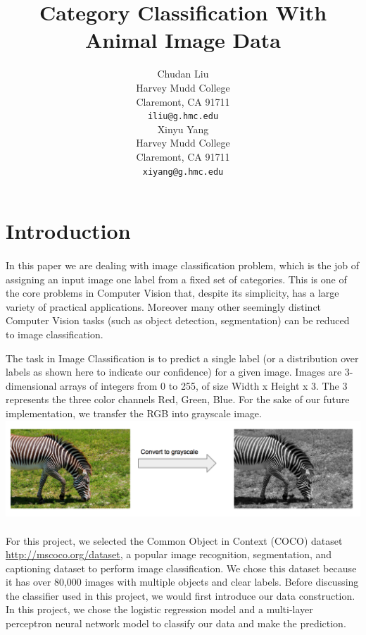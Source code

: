 \documentclass{article}
\title{Category Classification With Animal Image Data}
\author{
 Chudan Liu\\
 Harvey Mudd College\\
 Claremont, CA 91711 \\
 \texttt{iliu@g.hmc.edu} \\
  \And
  Xinyu Yang \\
  Harvey Mudd College \\
  Claremont, CA 91711 \\
  \texttt{xiyang@g.hmc.edu} \\
}
\begin{document}

\maketitle

\begin{abstract}
\end{abstract}

\section{Introduction}
\paragraph{}
	In this paper we are dealing with image classification problem, which is the job of assigning an input image one label from a fixed set of categories. This is one of the core problems in Computer Vision that, despite its simplicity, has a large variety of practical applications. Moreover many other seemingly distinct Computer Vision tasks (such as object detection, segmentation) can be reduced to image classification.
	
The task in Image Classification is to predict a single label (or a distribution over labels as shown here to indicate our confidence) for a given image. Images are 3-dimensional arrays of integers from 0 to 255, of size Width x Height x 3. The 3 represents the three color channels Red, Green, Blue. For the sake of our future implementation, we transfer the RGB into grayscale image. 
\\
\includegraphics[scale=0.57]{1.png}

\paragraph{}
For this project, we selected the Common Object in Context (COCO) dataset \url{http://mscoco.org/dataset}, a popular image recognition, segmentation, and captioning dataset to perform image classification. We chose this dataset because it has over 80,000 images with multiple objects and clear labels. Before discussing the classifier used in this project, we would first introduce our data construction. In this project, we chose the logistic regression model and a multi-layer perceptron neural network model to classify our data and make the prediction. 
\end{document}
